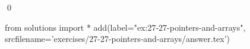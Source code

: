 
\begin{ex}
  \label{ex:27-27-pointers-and-arrays}
  
  \qed
\end{ex}
\begin{python0}
from solutions import *
add(label="ex:27-27-pointers-and-arrays",
    srcfilename='exercises/27-27-pointers-and-arrays/answer.tex')
\end{python0}
